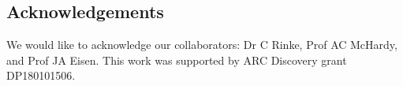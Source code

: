\documentclass[a0,landscape]{a0poster}
\begin{document}
\begin{multicols}{4}

\section*{Acknowledgements}
We would like to acknowledge our collaborators: Dr C Rinke, Prof AC McHardy, and Prof JA Eisen. This work was supported by ARC Discovery grant DP180101506. 

\end{multicols}
\end{document}
